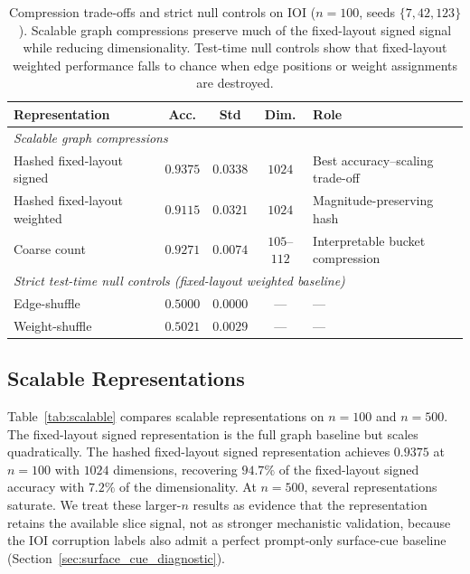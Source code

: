 \documentclass[11pt,a4paper]{article}
\begin{document}
\begin{table}[H]
\centering
\small
\begin{tabular}{lccc>{\raggedright\arraybackslash}p{}}
\toprule
\textbf{Representation} & \textbf{Acc.} & \textbf{Std} & \textbf{Dim.} & \textbf{Role} \\
\midrule
\multicolumn{5}{l}{\textit{Scalable graph compressions}} \\
Hashed fixed-layout signed & $0.9375$ & $0.0338$ & $1024$ & Best accuracy--scaling trade-off \\
Hashed fixed-layout weighted & $0.9115$ & $0.0321$ & $1024$ & Magnitude-preserving hash \\
Coarse count & $0.9271$ & $0.0074$ & $105$--$112$ & Interpretable bucket compression \\
\midrule
\multicolumn{5}{l}{\textit{Strict test-time null controls (fixed-layout weighted baseline)}} \\
Edge-shuffle & $0.5000$ & $0.0000$ & --- & --- \\
Weight-shuffle & $0.5021$ & $0.0029$ & --- & --- \\
\bottomrule
\end{tabular}
\caption{Compression trade-offs and strict null controls on IOI ($n=100$, seeds $\{7,42,123\}$). Scalable graph compressions preserve much of the fixed-layout signed signal while reducing dimensionality. Test-time null controls show that fixed-layout weighted performance falls to chance when edge positions or weight assignments are destroyed.}
\label{tab:baselines}
\end{table}

\subsection{Scalable Representations}

Table~\ref{tab:scalable} compares scalable representations on $n=100$ and $n=500$. The fixed-layout signed representation is the full graph baseline but scales quadratically. The hashed fixed-layout signed representation achieves $0.9375$ at $n=100$ with $1024$ dimensions, recovering $94.7\%$ of the fixed-layout signed accuracy with $7.2\%$ of the dimensionality. At $n=500$, several representations saturate. We treat these larger-$n$ results as evidence that the representation retains the available slice signal, not as stronger mechanistic validation, because the IOI corruption labels also admit a perfect prompt-only surface-cue baseline (Section~\ref{sec:surface_cue_diagnostic}).
\end{document}
